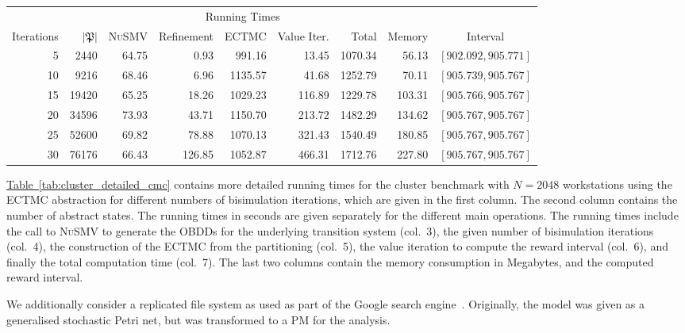 \documentclass[10pt,twocolumn]{article}
\newcommand{\NUSMV}{\textsc{NuSMV}\xspace}
\newcommand{\timeb}{\mathbf{t}}
\newcommand{\apart}{\mathfrak{P}}
\newcommand{\reftab}[1]{\texorpdfstring{\hyperref[tab:#1]{Table~\ref*{tab:#1}}}{Table~\ref*{tab:#1}}}
\begin{document}
\begin{table*}[tb]
  \centering
  \caption{Detailed experimental results for the workstation cluster ($N=2048$, $\timeb=500$) using the ECTMC abstraction}
  \label{tab:cluster_detailed_cmc}
\begin{tabular}{|rr|rrrrr|r|c|}
  \hline
             &              & \multicolumn{5}{c|}{Running Times}         &             &  \\
  Iterations & $|\apart|$ & \NUSMV & Refinement & ECTMC & Value Iter. & Total & Memory & Interval \\
  \hline
  5 & 2440 & 64.75 & 0.93 & 991.16 & 13.45 & 1070.34 & 56.13 & $[902.092, 905.771]$ \\
  10 & 9216 & 68.46 & 6.96 & 1135.57 & 41.68 & 1252.79 & 70.11 & $[905.739, 905.767]$ \\
  15 & 19420 & 65.25 & 18.26 & 1029.23 & 116.89 & 1229.78 & 103.31 & $[905.766, 905.767]$ \\
  20 & 34596 & 73.93 & 43.71 & 1150.70 & 213.72 & 1482.29 & 134.62 & $[905.767, 905.767]$ \\
  25 & 52600 & 69.82 & 78.88 & 1070.13 & 321.43 & 1540.49 & 180.85 & $[905.767, 905.767]$ \\
  30 & 76176 & 66.43 & 126.85 & 1052.87 & 466.31 & 1712.76 & 227.80 & $[905.767, 905.767]$ \\
  \hline
\end{tabular}
\end{table*}
\reftab{cluster_detailed_cmc} contains more detailed running times for
the cluster benchmark with $N=2048$ workstations using the ECTMC
abstraction for different numbers of bisimulation iterations, which
are given in the first column. The second column contains the number
of abstract states. The running times in seconds are given separately
for the different main operations. The running times include the call to \NUSMV to generate the
OBDDs for the underlying transition system (col.~3), the given number
of bisimulation iterations (col.~4), the construction of the ECTMC
from the partitioning (col.~5), the value iteration to compute the
reward interval (col.~6), and finally the total computation time
(col.~7). The last two columns contain the memory consumption in
Megabytes, and the computed reward interval.


We additionally consider a replicated file system as used as part of
the Google search engine~\cite{ClothH05,BaierHHHK12}. Originally, the model was given as a
generalised stochastic Petri net, but was transformed to a PM for the
analysis.
\end{document}

